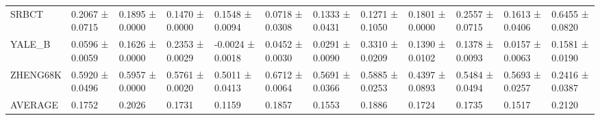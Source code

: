 \begin{tabular}{llllllllllll}
SRBCT & 0.2067 ± 0.0715 & 0.1895 ± 0.0000 & 0.1470 ± 0.0000 & 0.1548 ± 0.0094 & 0.0718 ± 0.0308 & 0.1333 ± 0.0431 & 0.1271 ± 0.1050 & 0.1801 ± 0.0000 & 0.2557 ± 0.0715 & 0.1613 ± 0.0406 & 0.6455 ± 0.0820 \\
YALE_B & 0.0596 ± 0.0059 & 0.1626 ± 0.0000 & 0.2353 ± 0.0029 & -0.0024 ± 0.0018 & 0.0452 ± 0.0030 & 0.0291 ± 0.0090 & 0.3310 ± 0.0209 & 0.1390 ± 0.0102 & 0.1378 ± 0.0093 & 0.0157 ± 0.0063 & 0.1581 ± 0.0190 \\
ZHENG68K & 0.5920 ± 0.0496 & 0.5957 ± 0.0000 & 0.5761 ± 0.0020 & 0.5011 ± 0.0413 & 0.6712 ± 0.0064 & 0.5691 ± 0.0366 & 0.5885 ± 0.0253 & 0.4397 ± 0.0893 & 0.5484 ± 0.0494 & 0.5693 ± 0.0257 & 0.2416 ± 0.0387 \\
AVERAGE & 0.1752 & 0.2026 & 0.1731 & 0.1159 & 0.1857 & 0.1553 & 0.1886 & 0.1724 & 0.1735 & 0.1517 & 0.2120 \\
\bottomrule
\end{tabular}
